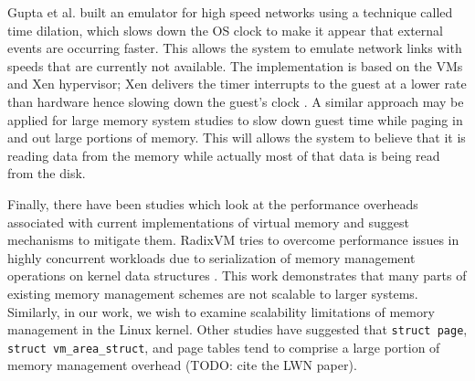 \documentclass[twocolumn,11pt]{article}
\begin{document}
Gupta et al. built an emulator for high speed networks using a technique called
time dilation, which slows down the OS clock to make it appear that external
events are occurring faster. This allows the system to emulate network links
with speeds that are currently not available. The implementation is based on
the VMs and Xen hypervisor; Xen delivers the timer interrupts to the guest at a
lower rate than hardware hence  slowing down the guest’s clock \cite{timedil}.
A similar approach may be applied for large memory system studies to slow down
guest time while paging in and out large portions of memory. This will allows
the system to believe that it is reading data from the memory while actually
most of that data is being read from the disk.

Finally, there have been studies which look at the performance overheads
associated with current implementations of virtual memory and suggest mechanisms
to mitigate them. RadixVM tries to overcome performance issues in highly
concurrent workloads due to serialization of memory management operations on
kernel data structures \cite{radixvm}. This work demonstrates that many parts of
existing memory management schemes are not scalable to larger systems.
Similarly, in our work, we wish to examine scalability limitations of memory
management in the Linux kernel. Other studies have suggested that \texttt{struct
page}, \texttt{struct vm\_area\_struct}, and page tables tend to comprise a
large portion of memory management overhead \cite{simics} (TODO: cite the LWN
paper).

{}

\end{document}
